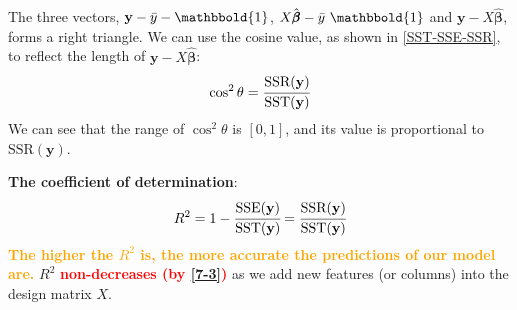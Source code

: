 \par
The three vectors, $\mathbf{y} - \bar{y} - \mathbbold{1}$, $X\hat{\pmb{\beta}} - \bar{y}\ \mathbbold{1}$ and $\mathbf{y} - X\hat{\pmb{\beta}}$, forms a right triangle. We can use the cosine value, as shown in \cref{SST-SSE-SSR}, to reflect the length of $\mathbf{y} - X\hat{\pmb{\beta}}$:
\begin{equation*}
    \cos^2\theta = \cfrac{\text{SSR}(\mathbf{y})}{\text{SST}(\mathbf{y})}
\end{equation*}
We can see that the range of $\cos^2 \theta$ is $[0, 1]$, and its value is proportional to $\text{SSR}(\mathbf{y})$.
\begin{Def}
    \textbf{The coefficient of determination}:
    \begin{equation}
        R^2 = 1 - \cfrac{\text{SSE}(\mathbf{y})}{\text{SST}(\mathbf{y})} = \cfrac{\text{SSR}(\mathbf{y})}{\text{SST}(\mathbf{y})}
    \end{equation}
    \textbf{\textcolor{orange}{The higher the $R^2$ is, the more accurate the predictions of our model are.}}
    $R^2$ \textbf{\textcolor{red}{non-decreases (by \cref{7-3})}} as we add new features (or columns) into the design matrix $X$.
\end{Def}